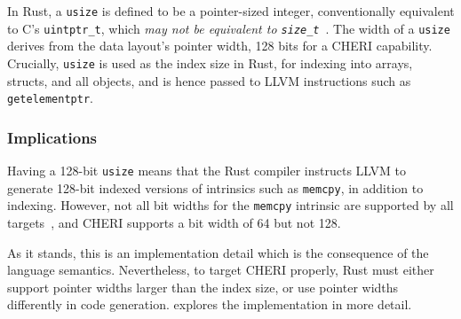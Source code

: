\documentclass[dissertation.tex]{subfiles}
\begin{document}
In Rust, a \texttt{usize} is defined to be a pointer-sized integer,
conventionally equivalent to C's \texttt{uintptr\_t}, which \emph{may
not be equivalent to \texttt{size\_t}}~\cite{rust-rfc-isize}.
The width of a \texttt{usize} derives from the data layout's pointer
width, 128 bits for a CHERI capability.
Crucially, \texttt{usize} is used as the index size in Rust, for
indexing into arrays, structs, and all objects, and is hence passed to
LLVM instructions such as \texttt{getelementptr}.

\subsubsection{Implications}
Having a 128-bit \texttt{usize} means that the Rust compiler instructs
LLVM to generate 128-bit indexed versions of intrinsics such as
\texttt{memcpy}, in addition to indexing.
However, not all bit widths for the \texttt{memcpy} intrinsic are
supported by all targets~\cite{llvm-langref}, and CHERI supports a bit
width of 64 but not 128.

As it stands, this is an implementation detail which is the consequence
of the language semantics.
Nevertheless, to target CHERI properly, Rust must either support pointer
widths larger than the index size, or use pointer widths differently in
code generation.
 explores the implementation in more detail.
\end{document}
